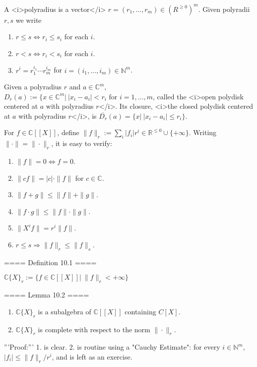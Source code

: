
A <i>polyradius is a vector</i> $r = (r_1,\ldots, r_m)\in (R^{\geq 0})^m$.
Given polyradii $r,s$ we write
\begin{enumerate}
  \item  $r\leq s \Leftrightarrow r_i \leq s_i$ for each $i$.
  \item  $r < s \Leftrightarrow r_i < s_i$ for each $i$.
  \item  $r^i = r_1^{i_1}\cdots r_m^{i_m}$ for $i = (i_1,\ldots, i_m)\in \mathbb{N}^m$.
\end{enumerate}
Given a polyradius $r$ and $a\in \mathbb{C}^m$, $D_r(a):= \{x\in \mathbb{C}^m |\ |x_i - a_i| < r_i
\textrm{ for } i = 1,\ldots,m$, called the <i>open polydisk centered at $a$ with polyradius $r$</i>.
Its closure, <i>the closed polydisk centered at $a$ with polyradius $r$</i>, is $\overline{D_r}(a) = \{x | \ |x_i - a_i| \leq r_i\}$.

For $f\in \mathbb{C}[[X]]$, define $\|f\|_r := \sum_i |f_i| r^i \in \mathbb{R}^{\leq 0} \cup \{+\infty\}$.
Writing $\|\cdot \| = \|\cdot \|_r$, it is easy to verify:
\begin{enumerate}
  \item  $\|f\| = 0 \Leftrightarrow f = 0$.
  \item  $\|c f\| = |c| \cdot \|f\|$ for $c\in \mathbb{C}$.
  \item  $\|f + g\| \leq \|f\| + \|g\|$.
  \item  $\|f\cdot g\| \leq \|f\| \cdot \|g\|$.
  \item  $\|X^i f\| = r^i \|f\|$.
  \item  $r\leq s \Rightarrow \|f\|_r \leq \|f\|_s$.
\end{enumerate}
==== Definition 10.1 ====

$\mathbb{C}\{X\}_r := \{f\in \mathbb{C}[[X]] |\ \|f\|_r < +\infty \}$

==== Lemma 10.2 ====

\begin{enumerate}
  \item  $\mathbb{C} \{X\}_r$ is a subalgebra of $\mathbb{C}[[X]]$ containing $C[X]$.
  \item  $\mathbb{C} \{X\}_r$ is complete with respect to the norm $\|\cdot\|_r$.
\end{enumerate}
'''Proof:'''
1. is clear. 2. is routine using a "Cauchy Estimate": for every $i\in \mathbb{N}^m$, $|f_i|\leq \|f\|_r/r^i$,
and is left as an exercise.


